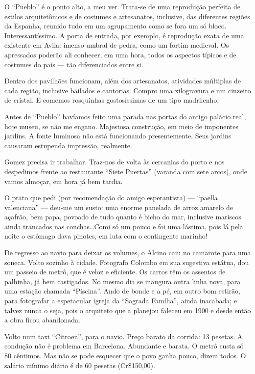 O ``Pueblo'' é o ponto alto, a meu ver. Trata-se de uma reprodução perfeita de estilos arquitetônicos e de costumes e artesanatos, inclusive, das diferentes regiões da Espanha, reunido tudo em um agrupamento como se fora um só bloco. Interessantíssimo. A porta de entrada, por exemplo, é reprodução exata de uma existente em Avila: imenso umbral de pedra, como um fortim medieval. Os apressados poderão ali conhecer, em uma hora, todos os aspectos típicos e de costumes do país --- tão diferenciados entre si.

Dentro dos pavilhões funcionam, além dos artesanatos, atividades múltiplas de cada região, inclusive bailados e cantorias. Compro uma xilogravura e um cinzeiro de cristal. E comemos rosquinhas gostosíssimas de um tipo madrilenho.

Antes de ``Pueblo'' havíamos feito uma parada nas portas do antigo palácio real, hoje museu, se não me engano. Majestosa construção, em meio de imponentes jardins. A fonte luminosa não está funcionando presentemente. Seus jardins causaram estupenda impressão, realmente.

Gomez precisa ir trabalhar. Traz-nos de volta às cercanias do porto e nos despedimos frente ao restaurante ``Siete Puertas'' (varanda com sete arcos), onde vamos almoçar, em hora já bem tardia.

O prato que pedi (por recomendação do amigo esperantista) --- ``paella valenciana'' --- deu-me um susto: uma enorme panelada de arroz amarelo de açafrão, bem papa, povoado de tudo quanto é bicho do mar, inclusive mariscos ainda trancados nas conchas\ldots Comi só um pouco e foi uma lástima, pois lá pela noite o estômago dava pinotes, em luta com o contingente marinho!

De regresso ao navio para deixar os volumes, o Alcino caiu no camarote para uma soneca. Volto sozinho à cidade. Fotografo Colombo em sua sugestiva estátua, dou um passeio de metrô, que é veloz e eficiente. Os carros têm os assentos de palhinha, já bem castigados. No mesmo dia se inaugura outra linha nova, para uma estação chamada ``Piscina''. Ando de bonde e a pé, em outro bom estirão, para fotografar a espetacular igreja da ``Sagrada Família'', ainda inacabada; e talvez nunca o seja, pois o arquiteto que a planejou faleceu em 1900 e desde então a obra ficou abandonada.

Volto num taxi ``Citroen'', para o navio. Preço barato da corrida: 13 pesetas. A condução não é problema em Barcelona. Abundante e barata. O metrô custa só 80 cêntimos. Mas não se pode esquecer que o povo ganha pouco, dizem todos. O salário mínimo diário é de 60 pesetas (Cr\$150,00).

